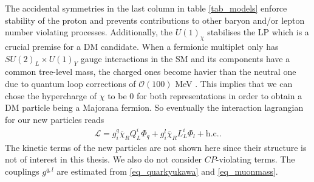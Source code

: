 The accidental symmetries in the last column in table \ref{tab_models}
enforce stability of the proton and prevents contributions to other baryon and/or lepton number violating
processes. Additionally, the $U(1)_\chi$ stabilises the LP which is a crucial premise for a DM candidate. 
When a fermionic multiplet only has $SU(2)_L\times U(1)_Y$ gauge interactions in the SM and its components have a common tree-level mass, the charged 
ones become havier than the neutral one due to quantum loop corrections of $\mathcal{O}(100)$ MeV \cite{Hisano}\cite{minMatter}. This implies that 
we can chose the hypercharge of $\chi$ to be 0 for both representations in order to obtain a DM particle being a Majorana fermion. So eventually 
the interaction lagrangian for our new particles reads
\begin{align}
 \mathcal{L} = g_i^q \bar \chi_R Q_L^i \Phi_q + g_i^l \bar \chi_R L_L^i \Phi_l + \text{h.c.}.
 \label{eq_modelLagrangian}
\end{align}
The kinetic terms of the new particles are not shown here since their structure is not of interest in this thesis. We also do not consider $CP$-violating
terms. The couplings $g^{q,l}$ are estimated from \eqref{eq_quarkyukawa} and \eqref{eq_muonmass}.